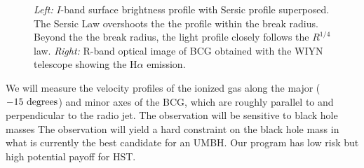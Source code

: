 \documentclass[12pt]{article}
\begin{document}
\begin{figure}[ht]
\begin{center}
\begin{minipage}{0.47\linewidth}
    \end{minipage}
    \caption{{\it{Left:}} $I$-band surface brightness profile with
      Sersic profile superposed. The Sersic Law overshoots the the
      profile within the break radius.  Beyond the the break radius,
      the light profile closely follows the $R^{1/4}$
      law. {\it{Right:}} R-band optical image of BCG obtained with the
      WIYN telescope showing the H$\alpha$ emission.}
    \label{fig}
  \end{center}
\end{figure}





%
%
\describeobservations   %

We will measure the velocity profiles of the ionized gas along the major ($-15~\rm degrees$) and minor axes of the BCG, which are
roughly parallel to and perpendicular to the radio jet.  The observation will be sensitive to black hole masses
The observation will yield a hard constraint on the black hole mass in what is currently
the best candidate for an UMBH.  Our program has low risk but high potential payoff for HST.  
\end{document}
